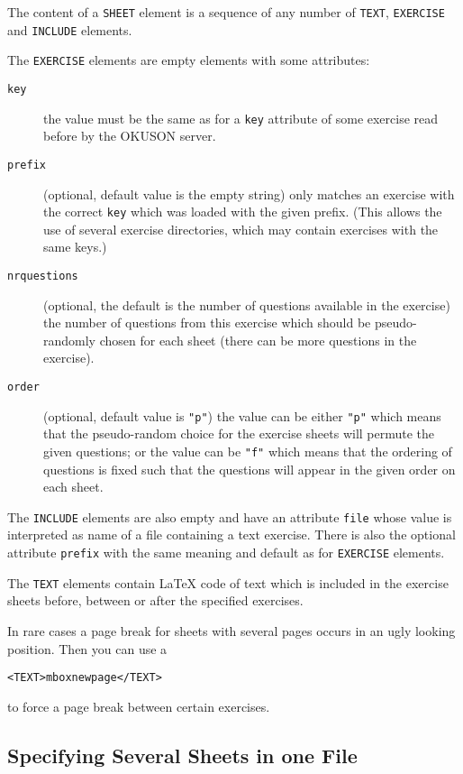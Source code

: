 \documentclass[12pt,openany,a4paper]{book}
\newcommand{\OKUSON}{\textsf{OKUSON}}
\begin{document}
The content of a \texttt{SHEET} element is a sequence of any number of 
\texttt{TEXT}, \texttt{EXERCISE} and \texttt{INCLUDE} elements.

The \texttt{EXERCISE} elements are empty elements with some  attributes:
\begin{description}
\item[\texttt{key}] the value must be the same as for a \texttt{key}
attribute of some exercise read before by the {\OKUSON} server.
\item[\texttt{prefix}] (optional, default value is the empty string) only
matches an exercise with the correct \texttt{key} which was loaded with the
given prefix. (This allows the use of several exercise directories, which
may contain exercises with the same keys.)
\item[\texttt{nrquestions}] (optional, the default is the number of
questions available in the exercise) the number of questions from this 
exercise which should be pseudo-randomly chosen for each 
sheet (there can be more questions in the exercise).
\item[\texttt{order}] (optional, default value is \texttt{"p"}) the value
can be either \texttt{"p"} which means that the pseudo-random choice for the
exercise sheets will permute the given questions; or the value can be
\texttt{"f"} which means that the ordering of questions is fixed such that
the questions will appear in the given order on each sheet.
\end{description}

The \texttt{INCLUDE} elements are also empty and have an attribute
\texttt{file} whose value is interpreted as name of a file containing a
text exercise. There is also the optional attribute \texttt{prefix} with the
same meaning and default as for \texttt{EXERCISE} elements.

The \texttt{TEXT} elements contain {\LaTeX} code of text which is included
in the exercise sheets before, between or after the specified exercises.

In rare cases a page break for sheets with several pages occurs in an
ugly looking position. Then you can use a 

\texttt{<TEXT>mboxnewpage</TEXT>}

to force a page break between certain exercises.

\subsection*{Specifying Several Sheets in one File}
\end{document}
